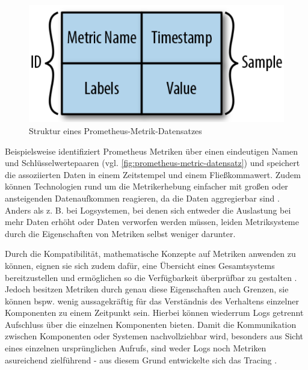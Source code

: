 \begin{figure}
\centering
\includegraphics[width=\linewidth]{img/03_methoden/prometheus-metric-sample.png}
\caption{Struktur eines Prometheus-Metrik-Datensatzes \cite{DistributedSystemsObservability}}
\label{fig:prometheus-metric-datensatz}
\end{figure}

Beispielsweise identifiziert Prometheus \cite{Prometheus} Metriken über einen eindeutigen Namen und Schlüsselwertepaaren (vgl. \autoref{fig:prometheus-metric-datensatz}) und speichert die assoziierten Daten in einem Zeitstempel und einem Fließkommawert. Zudem können Technologien rund um die Metrikerhebung einfacher mit großen oder ansteigenden Datenaufkommen reagieren, da die Daten aggregierbar sind \cite{DistributedSystemsObservability}. Anders als z. B. bei Logsystemen, bei denen sich entweder die Auslastung bei mehr Daten erhöht oder Daten verworfen werden müssen, leiden Metriksysteme durch die Eigenschaften von Metriken selbst weniger darunter.

Durch die Kompatibilität, mathematische Konzepte auf Metriken anwenden zu können, eignen sie sich zudem dafür, eine Übersicht eines Gesamtsystems bereitzustellen und ermöglichen so die Verfügbarkeit überprüfbar zu gestalten \cite{MultilevelObservabilityInCloudOrchestration} \cite{DistributedSystemsObservability}. Jedoch besitzen Metriken durch genau diese Eigenschaften auch Grenzen, sie können bspw. wenig aussagekräftig für das Verständnis des Verhaltens einzelner Komponenten zu einem Zeitpunkt sein. Hierbei können wiederrum Logs getrennt Aufschluss über die einzelnen Komponenten bieten. Damit die Kommunikation zwischen Komponenten oder Systemen nachvollziehbar wird, besonders aus Sicht eines einzelnen ursprünglichen Aufrufs, sind weder Logs noch Metriken asureichend zielführend - aus diesem Grund entwickelte sich das Tracing \cite{MultilevelObservabilityInCloudOrchestration} \cite{DistributedSystemsObservability}.

